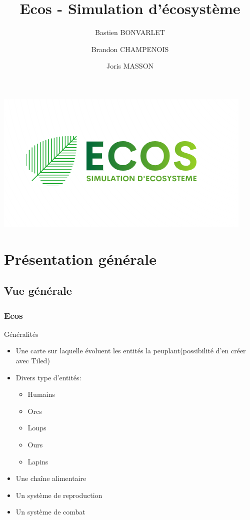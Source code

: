\documentclass{beamer}
\title{Ecos - Simulation d'écosystème}
\author{Bastien BONVARLET \and Brandon CHAMPENOIS \and Joris MASSON}
\institute{Université de Caen Normandie}
\begin{document}
\begin{frame}
\centering
\includegraphics[scale=0.6]{ecos.png}
\titlepage
\end{frame}

\begin{frame}
\tableofcontents[hideallsubsections]
\end{frame}



\section{Présentation générale}
\subsection{Vue générale}

\begin{frame} \frametitle{Ecos}
	\begin{block}{Généralités}
		\begin{itemize}
			\item Une carte sur laquelle évoluent les entités la peuplant(possibilité d'en créer avec Tiled)
			\item Divers type d'entités: 									\begin{itemize}
					\item Humains
					\item Orcs
					\item Loups
					\item Ours
					\item Lapins
				\end{itemize}
			\item Une chaîne alimentaire
			\item Un système de reproduction
			\item Un système de combat
		\end{itemize}
	\end{block}
\end{frame}
\end{document}
